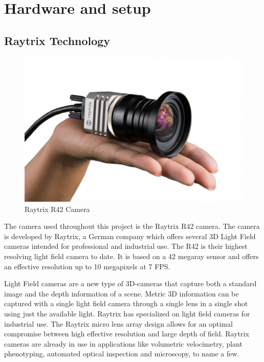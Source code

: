 \section{Hardware and setup} \label{hardware}

\subsection{Raytrix Technology}\label{the_raytrix_camera}

\begin{figure}[ht]
    \centering
    \includegraphics[width=.9\linewidth]{images/hardware/raytrix_camera}
    \caption{Raytrix R42 Camera\cite{website:raytrix_r42}}
    \label{fig:raytrix_camera}
\end{figure}

The camera used throughout this project is the Raytrix R42 camera. The camera is developed by Raytrix, a German company which offers several 3D Light Field cameras intended for professional and industrial use. The R42 is their highest resolving light field camera to date. It is based on a 42 megaray sensor and offers an effective resolution up to 10 megapixels at 7 FPS. \cite{website:raytrix_r42}

Light Field cameras are a new type of 3D-cameras that capture both a standard image and the depth information of a scene. Metric 3D information can be captured with a single light field camera through a single lens in a single shot using just the available light. Raytrix has specialized on light field cameras for industrial use. The Raytrix micro lens array design allows for an optimal compromise between high effective resolution and large depth of field. Raytrix cameras are already in use in applications like volumetric velocimetry, plant phenotyping, automated optical inspection and microscopy, to name a few. \cite{website:raytrix_main}

